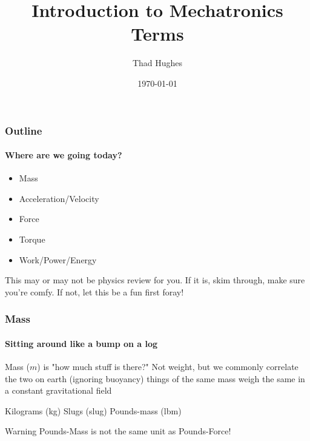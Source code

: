 \documentclass{beamer}%
\title{Introduction to Mechatronics Terms}
\author{Thad Hughes}
\date{\today}
\begin{document}
\maketitle

\begin{frame}
\frametitle{Outline}
\framesubtitle{Where are we going today?}

\begin{itemize}
	\item Mass
	\item Acceleration/Velocity
	\item Force
	\item Torque
	\item Work/Power/Energy
\end{itemize}

\begin{block}{}
	This may or may not be physics review for you. If it is, skim through, make sure you're comfy. If not, let this be a fun first foray!
\end{block}

\end{frame}



\begin{frame}
\frametitle{Mass}
\framesubtitle{Sitting around like a bump on a log}

\begin{outline}
	\1 Mass ($m$) is "how much stuff is there?"
	\1 Not weight, but we commonly correlate the two on earth
		\2 (ignoring buoyancy) things of the same mass weigh the same in a constant gravitational field
\end{outline}

\begin{examples}
\begin{outline}
	\1 Kilograms (kg)
	\1 Slugs (slug)
	\1 Pounds-mass (lbm)
\end{outline}
\end{examples}

\begin{alertblock}{Warning}
	Pounds-Mass is not the same unit as Pounds-Force!
\end{alertblock}

\end{frame}
\end{document}
